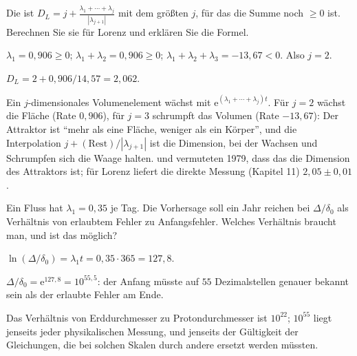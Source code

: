 \begin{aufgabe}
Die  ist $D_L = j + \frac{\lambda_1 + \cdots + \lambda_j}{|\lambda_{j+1}|}$ mit dem größten $j$, für das die Summe noch $\ge 0$ ist. Berechnen Sie sie für Lorenz und erklären Sie die Formel.

\loesung
{}
$\lambda_1 = 0{,}906 \ge 0$; $\lambda_1 + \lambda_2 = 0{,}906 \ge 0$; $\lambda_1 + \lambda_2 + \lambda_3 = -13{,}67 < 0$. Also $j = 2$.

$D_L = 2 + 0{,}906/14{,}57 = 2{,}062$.

Ein $j$-dimensionales Volumenelement wächst mit $\mathrm e^{(\lambda_1+\cdots+\lambda_j)t}$. Für $j = 2$ wächst die Fläche (Rate $0{,}906$), für $j = 3$ schrumpft das Volumen (Rate $-13{,}67$): Der Attraktor ist \enquote{mehr als eine Fläche, weniger als ein Körper}, und die Interpolation $j + (\text{Rest})/|\lambda_{j+1}|$ ist die Dimension, bei der Wachsen und Schrumpfen sich die Waage halten.  und  vermuteten 1979, dass das die Dimension des Attraktors ist; für Lorenz liefert die direkte Messung (Kapitel 11) $2{,}05 \pm 0{,}01$. \checkmark
\end{aufgabe}

\begin{aufgabe}
Ein Fluss hat $\lambda_1 = 0{,}35$ je Tag. Die Vorhersage soll ein Jahr reichen bei $\Delta/\delta_0$ als Verhältnis von erlaubtem Fehler zu Anfangsfehler. Welches Verhältnis braucht man, und ist das möglich?

\loesung
{}
$\ln(\Delta/\delta_0) = \lambda_1 t = 0{,}35\cdot365 = 127{,}8$.

$\Delta/\delta_0 = \mathrm e^{127{,}8} = 10^{55{,}5}$: der Anfang müsste auf $55$ Dezimalstellen genauer bekannt sein als der erlaubte Fehler am Ende.

Das Verhältnis von Erddurchmesser zu Protondurchmesser ist $10^{22}$; $10^{55}$ liegt jenseits jeder physikalischen Messung, und jenseits der Gültigkeit der Gleichungen, die bei solchen Skalen durch andere ersetzt werden müssten.

\begin{center}
\begin{minipage}{0.88\textwidth}
\end{minipage}
\end{center}
\end{aufgabe}

